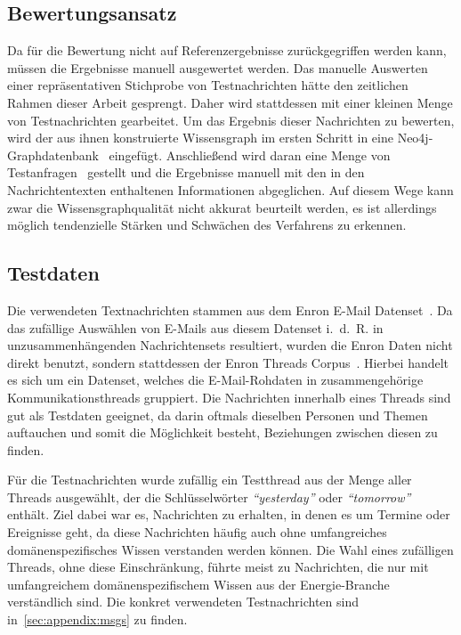 \subsection{Bewertungsansatz}%
\label{sec:evaluation:quality:method}

Da für die Bewertung nicht auf Referenzergebnisse zurückgegriffen werden kann, müssen die Ergebnisse manuell ausgewertet werden.
Das manuelle Auswerten einer repräsentativen Stichprobe von Testnachrichten hätte den zeitlichen Rahmen dieser Arbeit gesprengt.
Daher wird stattdessen mit einer kleinen Menge von Testnachrichten gearbeitet.
Um das Ergebnis dieser Nachrichten zu bewerten, wird der aus ihnen konstruierte Wissensgraph im ersten Schritt in eine Neo4j-Graphdatenbank~\cite{Neo4j} eingefügt.
Anschließend wird daran eine Menge von Testanfragen~ gestellt und die Ergebnisse manuell mit den in den Nachrichtentexten enthaltenen Informationen abgeglichen.
Auf diesem Wege kann zwar die Wissensgraphqualität nicht akkurat beurteilt werden, es ist allerdings möglich tendenzielle Stärken und Schwächen des Verfahrens zu erkennen.

\subsection{Testdaten}%
\label{sec:evaluation:quality:data}

Die verwendeten Textnachrichten stammen aus dem Enron E-Mail Datenset~\cite{Cohen2015}.
Da das zufällige Auswählen von E-Mails aus diesem Datenset i.~d.~R. in unzusammenhängenden Nachrichtensets resultiert, wurden die Enron Daten nicht direkt benutzt, sondern stattdessen der Enron Threads Corpus~\cite{Jamison2013}\cite{EnronThreads}.
Hierbei handelt es sich um ein Datenset, welches die E-Mail-Rohdaten in zusammengehörige Kommunikationsthreads gruppiert.
Die Nachrichten innerhalb eines Threads sind gut als Testdaten geeignet, da darin oftmals dieselben Personen und Themen auftauchen und somit die Möglichkeit besteht, Beziehungen zwischen diesen zu finden.

Für die Testnachrichten wurde zufällig ein Testthread aus der Menge aller Threads ausgewählt, der die Schlüsselwörter \textit{``yesterday''} oder \textit{``tomorrow''} enthält.
Ziel dabei war es, Nachrichten zu erhalten, in denen es um Termine oder Ereignisse geht, da diese Nachrichten häufig auch ohne umfangreiches domänenspezifisches Wissen verstanden werden können.
Die Wahl eines zufälligen Threads, ohne diese Einschränkung, führte meist zu Nachrichten, die nur mit umfangreichem domänenspezifischem Wissen aus der Energie-Branche verständlich sind.
Die konkret verwendeten Testnachrichten sind in~\ref{sec:appendix:msgs} zu finden.

